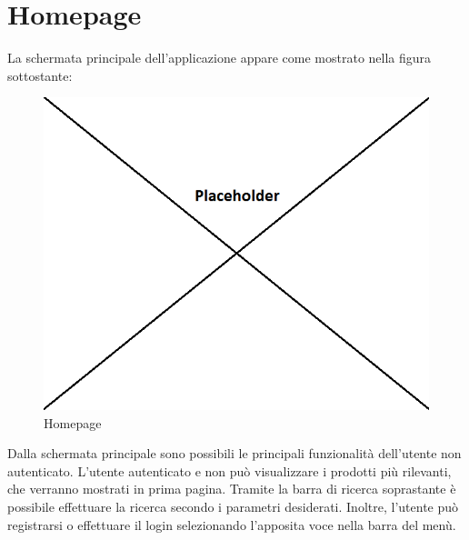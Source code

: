 \newpage
\section{Homepage}

La schermata principale dell'applicazione appare come mostrato nella figura sottostante:

\label{Homepage}
\begin{figure}[H]
	\centering
	\includegraphics[scale=0.45]{img/homepage.png}
	\caption{Homepage}
\end{figure}

Dalla schermata principale sono possibili le principali funzionalità dell'utente non autenticato. L'utente autenticato e non può visualizzare i prodotti più rilevanti, che verranno mostrati in prima pagina. Tramite la barra di ricerca soprastante è possibile effettuare la ricerca secondo i parametri desiderati. Inoltre, l'utente può registrarsi o effettuare il login selezionando l'apposita voce nella barra del menù.

